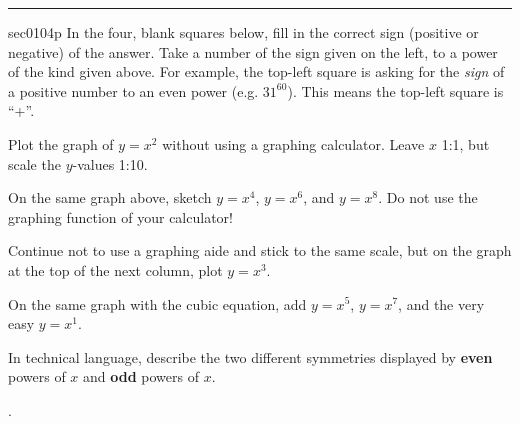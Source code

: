 \renewcommand{\columnseprule}{1.5pt}
\begin{multicols*}{2}
\rule[0.5\baselineskip]{0.4\textwidth}{1pt}
\noindent
{}\label{sec0104p}
\begin{exercises}{sec0104p}
\lab[0104LabTable]In the four, blank squares below, fill in the correct sign (positive or negative) 
of the answer.
Take a number of the sign given on the left, to a power of the kind given above.  For example, 
the top-left square is asking for the \emph{sign} of a positive number to an even power (e.g. $31^{60}$).  This means the top-left square is ``+''.

\noindent
{}

\lab[0104LabSquared] Plot the graph of $y=x^2$ without using a graphing calculator.  
Leave $x$ 1:1, but scale the $y$-values 1:10.

\noindent
\begin{centering}
\end{centering}

\lab[0104LabEven] On the same graph above, sketch $y=x^4$, $y=x^6$, and $y=x^8$.  
Do not use the graphing function of your calculator!


\lab[0104LabCubed] Continue not to use a graphing aide and stick to the same scale, but on the graph at the top of the next column, plot $y=x^3$.
 
\lab[0104LabOdd] On the same graph with the cubic equation, add $y=x^5$, $y=x^7$, and the very
easy $y=x^1$.

\lab[0104LabDescribe] In technical language, describe the two different symmetries displayed 
by \textbf{even} powers of $x$ and \textbf{odd} powers of $x$. 

\vspace{1.2cm}
.

\noindent
{}


\end{exercises}
\end{multicols*}

